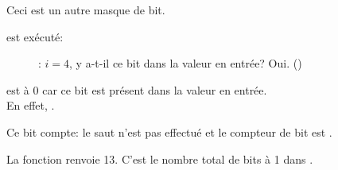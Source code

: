 Ceci est un autre masque de bit.

\clearpage
\AND est exécuté:

\begin{figure}[H]
\centering
{}
\caption{\olly: $i=4$, 
y a-t-il ce bit dans la valeur en entrée? Oui. ()}
\label{fig:shifts_olly4_3}
\end{figure}

\ZF est à 0 car ce bit est présent dans la valeur en entrée.\\
En effet, .

Ce bit compte: le saut n'est pas effectué et le compteur de bit est
.

La fonction renvoie 13.
C'est le nombre total de bits à 1 dans .

